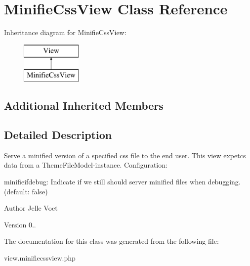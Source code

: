 \hypertarget{class_minifie_css_view}{\section{Minifie\-Css\-View Class Reference}
\label{class_minifie_css_view}
}
Inheritance diagram for Minifie\-Css\-View\-:\begin{figure}[H]
\begin{center}
\leavevmode
\includegraphics[height=2.000000cm]{class_minifie_css_view}
\end{center}
\end{figure}
\subsection*{Additional Inherited Members}


\subsection{Detailed Description}
Serve a minified version of a specified css file to the end user. This view expetcs data from a Theme\-File\-Model-\/instance. Configuration\-:
\begin{DoxyItemize}
\item minifieifdebug\-: Indicate if we still should server minified files when debugging. (default\-: false)
\end{DoxyItemize}

\begin{DoxyAuthor}{Author}
Jelle Voet 
\end{DoxyAuthor}
\begin{DoxyVersion}{Version}
0.. 
\end{DoxyVersion}


The documentation for this class was generated from the following file\-:\begin{DoxyCompactItemize}
\item 
view.\-minifiecssview.\-php\end{DoxyCompactItemize}

